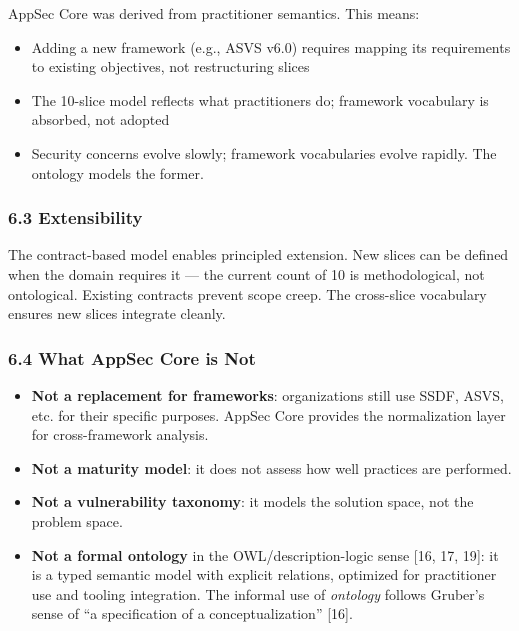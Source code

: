 \documentclass[
]{article}
\providecommand{\tightlist}{%
  \setlength{\itemsep}{0pt}\setlength{\parskip}{0pt}}
\begin{document}
AppSec Core was derived from practitioner semantics. This means:

\begin{itemize}
\tightlist
\item
  Adding a new framework (e.g., ASVS v6.0) requires mapping its
  requirements to existing objectives, not restructuring slices
\item
  The 10-slice model reflects what practitioners do; framework
  vocabulary is absorbed, not adopted
\item
  Security concerns evolve slowly; framework vocabularies evolve
  rapidly. The ontology models the former.
\end{itemize}

\subsubsection{6.3 Extensibility}\label{extensibility}

The contract-based model enables principled extension. New slices can be
defined when the domain requires it --- the current count of 10 is
methodological, not ontological. Existing contracts prevent scope creep.
The cross-slice vocabulary ensures new slices integrate cleanly.

\subsubsection{6.4 What AppSec Core is
Not}\label{what-appsec-core-is-not}

\begin{itemize}
\tightlist
\item
  \textbf{Not a replacement for frameworks}: organizations still use
  SSDF, ASVS, etc. for their specific purposes. AppSec Core provides the
  normalization layer for cross-framework analysis.
\item
  \textbf{Not a maturity model}: it does not assess how well practices
  are performed.
\item
  \textbf{Not a vulnerability taxonomy}: it models the solution space,
  not the problem space.
\item
  \textbf{Not a formal ontology} in the OWL/description-logic sense
  {[}16, 17, 19{]}: it is a typed semantic model with explicit
  relations, optimized for practitioner use and tooling integration. The
  informal use of \emph{ontology} follows Gruber's sense of ``a
  specification of a conceptualization'' {[}16{]}.
\end{itemize}
\end{document}
